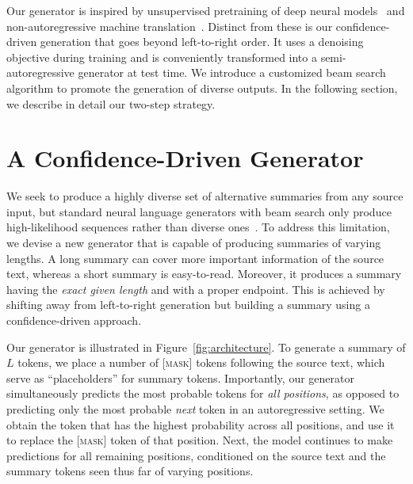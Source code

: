 \documentclass[11pt]{article}
\begin{document}
Our generator is inspired by unsupervised pretraining of deep neural models~\cite{peters-etal-2018-deep,radford2019language,devlin-etal-2019-bert,yan2020prophetnet,zhang2020pegasus,lewis-etal-2020-bart} and non-autoregressive machine translation~\cite{gu2018nonautoregressive,ghazvininejad-etal-2019-mask}.
Distinct from these is our confidence-driven generation that goes beyond left-to-right order.
It uses a denoising objective during training and is conveniently transformed into a semi-autoregressive generator at test time.
We introduce a customized beam search algorithm to promote the generation of diverse outputs.
In the following section, we describe in detail our two-step strategy.


\section{A Confidence-Driven Generator}
\label{sec:method}

We seek to produce a highly diverse set of alternative summaries from any source input, but standard neural language generators with beam search only produce high-likelihood sequences rather than diverse ones~\cite{ippolito-etal-2019-comparison}.
To address this limitation, we devise a new generator that is capable of producing summaries of varying lengths. 
A long summary can cover more important information of the source text, whereas a short summary is easy-to-read.
Moreover, it produces a summary having the \emph{exact given length} and with a proper endpoint.
This is achieved by shifting away from left-to-right generation but building a summary using a confidence-driven approach.
 

Our generator is illustrated in Figure~\ref{fig:architecture}.
To generate a summary of $L$ tokens, we place a number of \textsc{[mask]} tokens following the source text, which serve as ``placeholders'' for summary tokens.
Importantly, our generator simultaneously predicts the most probable tokens for \emph{all positions}, as opposed to predicting only the most probable \emph{next} token in an autoregressive setting.
We obtain the token that has the highest probability across all positions, and use it to replace the \textsc{[mask]} token of that position.
Next, the model continues to make predictions for all remaining positions, conditioned on the source text and the summary tokens seen thus far of varying positions.
\end{document}
